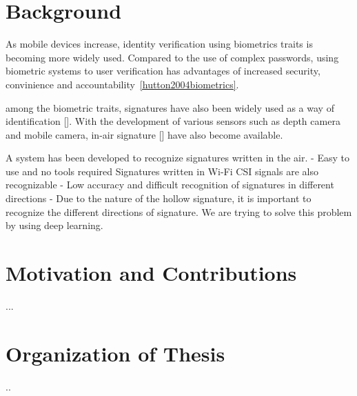 \section{Background}
As mobile devices increase, identity verification using biometrics traits is becoming more widely used.
Compared to the use of complex passwords, using biometric systems to user verification has advantages of increased security, convinience and accountability~\ref{hutton2004biometrics}.

among the biometric traits, signatures have also been widely used as a way of identification [].
With the development of various sensors such as depth camera and mobile camera, in-air signature [] have also become available.

A system has been developed to recognize signatures written in the air.
- Easy to use and no tools required
Signatures written in Wi-Fi CSI signals are also recognizable
- Low accuracy and difficult recognition of signatures in different directions
- Due to the nature of the hollow signature, it is important to recognize the different directions of signature.
We are trying to solve this problem by using deep learning.


\section{Motivation and Contributions}
...
\newpage
\section{Organization of Thesis}
..